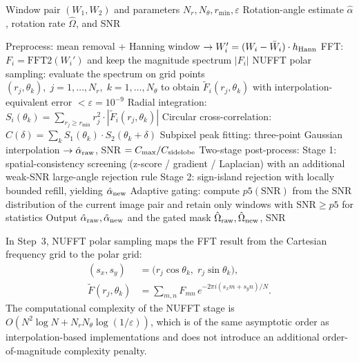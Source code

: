 \documentclass[lettersize,journal]{IEEEtran}
\begin{document}
\begin{algorithm}
\caption{NUFFT Polar-Magnitude Rotation-Rate Estimation}
\label{alg:nufft_rotation}
\begin{algorithmic}[1]
  \REQUIRE Window pair $(W_1, W_2)$ and parameters $N_r, N_\theta, r_{\min}, \varepsilon$
  \ENSURE Rotation-angle estimate $\hat{\alpha}$, rotation rate $\hat{\Omega}$, and SNR

  \STATE Preprocess: mean removal + Hanning window
    $\rightarrow W_i' = (W_i - \bar{W}_i) \cdot h_{\rm Hann}$
  \STATE FFT: $F_i = \mathrm{FFT2}(W_i')$ and keep the magnitude spectrum $|F_i|$
  \STATE NUFFT polar sampling: evaluate the spectrum on grid points
    $(r_j, \theta_k),\; j=1,\ldots,N_r,\; k=1,\ldots,N_\theta$
    to obtain $\tilde{F}_i(r_j, \theta_k)$ with interpolation-equivalent error $< \varepsilon = 10^{-9}$
  \STATE Radial integration:
    $S_i(\theta_k) = \sum_{r_j \geq r_{\min}} r_j^2 \cdot |\tilde{F}_i(r_j, \theta_k)|$
  \STATE Circular cross-correlation:
    $C(\delta) = \sum_k S_1(\theta_k) \cdot S_2(\theta_k + \delta)$
  \STATE Subpixel peak fitting: three-point Gaussian interpolation
    $\rightarrow \hat{\alpha}_{\rm raw}$, SNR $= C_{\max}/C_{\rm sidelobe}$
  \STATE Two-stage post-process:
    \STATE Stage 1: spatial-consistency screening (z-score / gradient / Laplacian)
      with an additional weak-SNR large-angle rejection rule
    \STATE Stage 2: sign-island rejection with locally bounded refill, yielding $\hat{\alpha}_{\rm new}$
  \STATE Adaptive gating: compute $p5(\mathrm{SNR})$ from the SNR distribution of the current image pair
    and retain only windows with $\mathrm{SNR} \ge p5$ for statistics
  \STATE Output $\hat{\alpha}_{\rm raw},\hat{\alpha}_{\rm new}$ and the gated mask
  \RETURN $\hat{\Omega}_{\rm raw},\hat{\Omega}_{\rm new}$, SNR
\end{algorithmic}
\end{algorithm}

In Step~3, NUFFT polar sampling maps the FFT result from the Cartesian frequency grid to the polar grid:
%
\begin{align}
  (s_x, s_y) &= \bigl(r_j \cos\theta_k,\; r_j \sin\theta_k\bigr), \\
  \tilde{F}(r_j, \theta_k) &= \sum_{m,n} F_{mn}\,
    e^{-2\pi i (s_x m + s_y n)/N}.
  \label{eq:nufft}
\end{align}
%
The computational complexity of the NUFFT stage is
$O(N^2 \log N + N_r N_\theta \log(1/\varepsilon))$,
which is of the same asymptotic order as interpolation-based implementations and does not introduce an additional order-of-magnitude complexity penalty.
\end{document}
